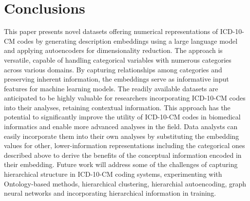 \documentclass{bmcart}
\begin{document}
\section*{Conclusions}

This paper presents novel datasets offering numerical representations of 
ICD-10-CM codes by generating description embeddings using a large language 
model and applying autoencoders for dimensionality reduction. The approach is 
versatile, capable of handling categorical variables with numerous categories 
across various domains. By capturing relationships among categories and 
preserving inherent information, the embeddings serve as informative input 
features for machine learning models.  The readily available datasets are 
anticipated to be highly valuable for researchers incorporating ICD-10-CM 
codes into their analyses, retaining contextual information. This approach 
has the potential to significantly improve the utility of ICD-10-CM codes in 
biomedical informatics and enable more advanced analyses in the field.
Data analysts can easily incorporate them into their own analyses by 
substituting the embedding values for other, lower-information representations
including the categorical ones described above to derive the benefits
of the conceptual information encoded in their embedding.
Future work will address some of the challenges of capturing hierarchical
structure in ICD-10-CM coding systems, experimenting with Ontology-based 
methods, hierarchical clustering, hierarchial autoencoding, graph neural 
networks and incorporating hierarchical information in training.
\end{document}
